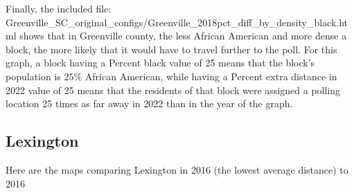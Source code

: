 \documentclass[11pt]{article}
\theoremstyle{remark}
\theoremstyle{definition}
\begin{document}
Finally, the included file: \textrm{Greenville\_SC\_original\_configs/Greenville\_2018pct\_diff\_by\_density\_black.html} shows that in Greenville county, the less African American and more dense a block, the more likely that it would have to travel further to the poll. For this graph, a block having a Percent black value of 25 means that the block's population is $25\%$ African American, while having a Percent extra distance in 2022 value of 25 means that the residents of that block were assigned a polling location 25 times as far away in 2022 than in the year of the graph.

\pagebreak 

\subsection{Lexington}
Here are the maps comparing Lexington in 2016 (the lowest average distance) to 2016
\end{document}
